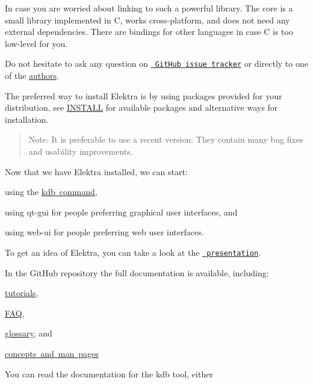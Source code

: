 In case you are worried about linking to such a powerful library. The core is a small library implemented in C, works cross-\/platform, and does not need any external dependencies. There are bindings for other languages in case C is too low-\/level for you.

Do not hesitate to ask any question on \href{https://issues.libelektra.org/}{\texttt{ Git\+Hub issue tracker}} or directly to one of the \mbox{\hyperlink{doc_AUTHORS_md}{authors}}.

The preferred way to install Elektra is by using packages provided for your distribution, see \mbox{\hyperlink{doc_INSTALL_md}{I\+N\+S\+T\+A\+LL}} for available packages and alternative ways for installation.

\begin{quote}
Note\+: It is preferable to use a recent version\+: They contain many bug fixes and usability improvements. \end{quote}


Now that we have Elektra installed, we can start\+:


\begin{DoxyItemize}
\item using the \mbox{\hyperlink{doc_help_kdb_md}{kdb command}},
\item using qt-\/gui for people preferring graphical user interfaces, and
\item using web-\/ui for people preferring web user interfaces.
\end{DoxyItemize}

To get an idea of Elektra, you can take a look at the \href{https://www.libelektra.org/ftp/elektra/presentations/2016/FOSDEM/fosdem.odp}{\texttt{ presentation}}.

In the Git\+Hub repository the full documentation is available, including\+:


\begin{DoxyItemize}
\item \mbox{\hyperlink{md_doc_tutorials_README_doc_tutorials_README_md}{tutorials}},
\item \mbox{\hyperlink{doc_help_elektra-faq_md}{F\+AQ}},
\item \mbox{\hyperlink{doc_help_elektra-glossary_md}{glossary}}, and
\item \mbox{\hyperlink{doc_help_elektra-introduction_md}{concepts and man pages}}
\end{DoxyItemize}

You can read the documentation for the kdb tool, either


